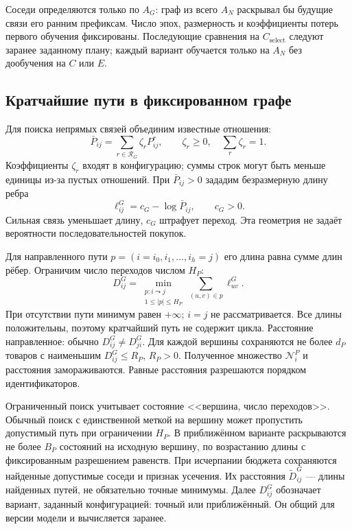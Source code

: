 \documentclass[12pt,a4paper]{article}
\theoremstyle{plainru}
\begin{document}
Соседи определяются только по $A_G$: граф из всего $A_N$ раскрывал бы
будущие связи его ранним префиксам. Число эпох, размерность и коэффициенты
потерь первого обучения фиксированы. Последующие сравнения на $C_{\mathrm{select}}$
следуют заранее заданному плану; каждый вариант обучается только на $A_N$
без дообучения на $C$ или $E$.

\subsection{Кратчайшие пути в фиксированном графе}
\label{sec:modern-paths}

Для поиска непрямых связей объединим известные отношения:
\begin{equation}\label{eq:modern-path-base}
\bar P_{ij}=\sum_{r\in\mathcal R_G}\zeta_rP^r_{ij},\qquad
\zeta_r\ge0,\quad\sum_r\zeta_r=1.
\end{equation}
Коэффициенты $\zeta_r$ входят в конфигурацию; суммы строк могут быть
меньше единицы из-за пустых отношений. При $\bar P_{ij}>0$
зададим безразмерную длину ребра
\begin{equation}\label{eq:modern-path-edge}
\ell_{ij}^{G}=c_G-\log\bar P_{ij},\qquad c_G>0.
\end{equation}
Сильная связь уменьшает длину, $c_G$ штрафует переход.
Эта геометрия не задаёт вероятности последовательностей покупок.

Для направленного пути $p=(i=i_0,i_1,\ldots,i_h=j)$ его длина
равна сумме длин рёбер. Ограничим число переходов числом $H_P$:
\begin{equation}\label{eq:modern-distance}
D_{ij}^{G}=
\min_{\substack{p:i\leadsto j\\1\le |p|\le H_P}}
\sum_{(u,v)\in p}\ell_{uv}^{G}.
\end{equation}
При отсутствии пути минимум равен $+\infty$; $i=j$ не рассматривается.
Все длины положительны, поэтому кратчайший путь не содержит цикла.
Расстояние направленное: обычно $D_{ij}^{G}\ne D_{ji}^{G}$.
Для каждой вершины сохраняются не более $d_P$ товаров
с наименьшим $D_{ij}^{G}\le R_P$, $R_P>0$.
Полученное множество $\mathcal N_i^{P}$ и расстояния замораживаются.
Равные расстояния разрешаются порядком идентификаторов.

Ограниченный поиск учитывает состояние <<вершина, число переходов>>.
Обычный поиск с единственной меткой на вершину может пропустить
допустимый путь при ограничении $H_P$.
В приближённом варианте раскрываются не более $B_P$ состояний
на исходную вершину, по возрастанию длины с фиксированным разрешением
равенств. При исчерпании бюджета сохраняются найденные допустимые соседи
и признак усечения. Их расстояния $\widetilde D_{ij}^{G}$ --- длины
найденных путей, не обязательно точные минимумы.
Далее $D_{ij}^{G}$ обозначает вариант, заданный конфигурацией:
точный или приближённый. Он общий для версии модели и вычисляется заранее.
\end{document}
